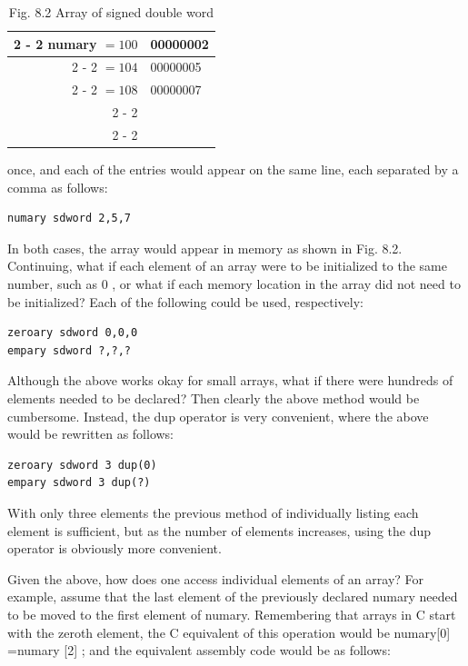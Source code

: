 \documentclass[10pt]{article}
\begin{document}
\begin{table}[h]
\begin{center}
\begin{tabular}{rl|}
\cline { 2 - 2 }
numary $=100$ & 00000002 \\
\cline { 2 - 2 }
$=104$ & 00000005 \\
\cline { 2 - 2 }
$=108$ & 00000007 \\
\cline { 2 - 2 }
 &  \\
\cline { 2 - 2 }
\end{tabular}
\captionsetup{labelformat=empty}
\caption{Fig. 8.2 Array of signed double word}
\end{center}
\end{table}

once, and each of the entries would appear on the same line, each separated by a comma as follows:

\begin{verbatim}
numary sdword 2,5,7
\end{verbatim}

In both cases, the array would appear in memory as shown in Fig. 8.2.\\
Continuing, what if each element of an array were to be initialized to the same number, such as 0 , or what if each memory location in the array did not need to be initialized? Each of the following could be used, respectively:

\begin{verbatim}
zeroary sdword 0,0,0
empary sdword ?,?,?
\end{verbatim}

Although the above works okay for small arrays, what if there were hundreds of elements needed to be declared? Then clearly the above method would be cumbersome. Instead, the dup operator is very convenient, where the above would be rewritten as follows:

\begin{verbatim}
zeroary sdword 3 dup(0)
empary sdword 3 dup(?)
\end{verbatim}

With only three elements the previous method of individually listing each element is sufficient, but as the number of elements increases, using the dup operator is obviously more convenient.

Given the above, how does one access individual elements of an array? For example, assume that the last element of the previously declared numary needed to be moved to the first element of numary. Remembering that arrays in C start with the zeroth element, the C equivalent of this operation would be numary[0] =numary [2] ; and the equivalent assembly code would be as follows:
\end{document}
